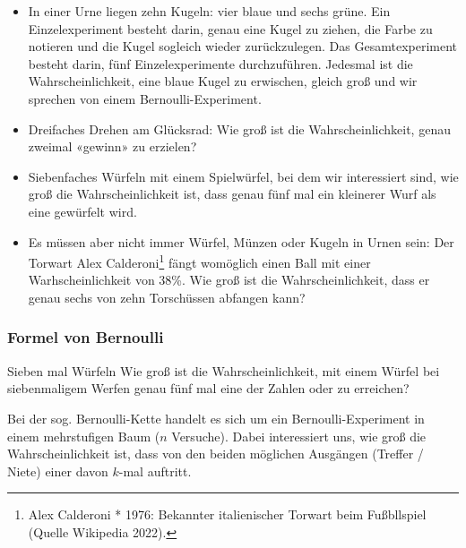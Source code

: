 \begin{itemize}
\item
In einer Urne liegen zehn Kugeln: vier blaue und sechs grüne. Ein
Einzelexperiment besteht darin, genau eine Kugel zu ziehen, die Farbe
zu notieren und die Kugel sogleich wieder zurückzulegen.
Das Gesamtexperiment besteht darin, fünf Einzelexperimente
durchzuführen. Jedesmal ist die Wahrscheinlichkeit, eine blaue Kugel
zu erwischen, gleich groß und wir sprechen von einem Bernoulli-Experiment.

\item Dreifaches Drehen am Glücksrad: Wie groß ist die Wahrscheinlichkeit, genau zweimal «gewinn» zu erzielen?

\item Siebenfaches Würfeln mit einem Spielwürfel, bei dem wir
  interessiert sind, wie groß die Wahrscheinlichkeit ist, dass genau fünf mal ein kleinerer Wurf als eine  gewürfelt wird.
  
\item
Es müssen aber nicht immer Würfel, Münzen oder Kugeln in Urnen sein:
Der Torwart Alex Calderoni\footnote{Alex Calderoni * 1976: Bekannter
  italienischer Torwart beim Fußbllspiel (Quelle Wikipedia 2022).}
fängt womöglich einen Ball mit einer
Warhscheinlichkeit von 38\%.
Wie groß ist die Wahrscheinlichkeit, dass er genau sechs von zehn Torschüssen
abfangen kann?
\end{itemize}
\newpage


\subsubsection{Formel von Bernoulli}



\begin{beispiel}{Sieben mal Würfeln}{}
Wie groß ist die Wahrscheinlichkeit, mit einem Würfel bei
siebenmaligem Werfen genau fünf mal eine der Zahlen  oder
 zu erreichen?
\end{beispiel}

Bei der sog. Bernoulli-Kette handelt es sich um ein
Bernoulli-Experiment
in einem mehrstufigen Baum ($n$ Versuche). Dabei interessiert
uns, wie groß die Wahrscheinlichkeit ist, dass von den beiden
möglichen Ausgängen (Treffer / Niete) einer davon $k$-mal auftritt.

